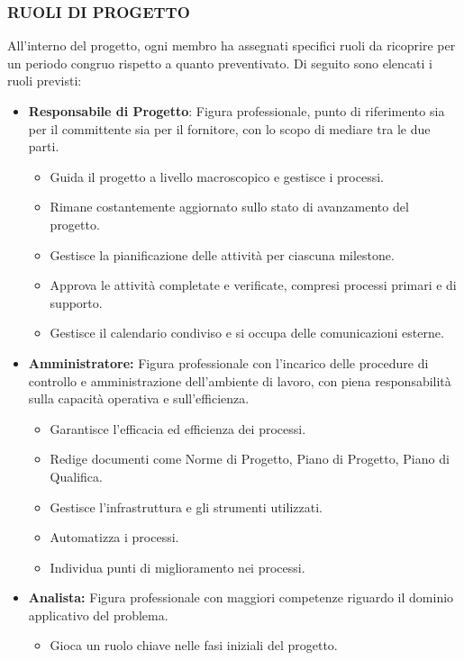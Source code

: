 \documentclass{article}
\begin{document}
\subsubsection{RUOLI DI PROGETTO}
All'interno del progetto, ogni membro ha assegnati specifici ruoli da ricoprire per un periodo congruo rispetto a quanto preventivato. Di seguito sono elencati i ruoli previsti:
\begin{itemize}
    \item \textbf{Responsabile di Progetto}:
        Figura professionale, punto di riferimento sia per il committente sia per il fornitore, con lo scopo di mediare tra le due parti.
        \begin{itemize}
            \item Guida il progetto a livello macroscopico e gestisce i processi.
            \item  Rimane costantemente aggiornato sullo stato di avanzamento del progetto.
            \item Gestisce la pianificazione delle attività per ciascuna milestone.
            \item Approva le attività completate e verificate, compresi processi primari e di supporto.
            \item Gestisce il calendario condiviso e si occupa delle comunicazioni esterne.
        \end{itemize}
    \item \textbf{Amministratore:}
        Figura professionale con l’incarico delle procedure di controllo e amministrazione dell’ambiente di lavoro, con piena responsabilità sulla capacità operativa e sull’efficienza.
        \begin{itemize}
            \item Garantisce l'efficacia ed efficienza dei processi.
            \item Redige documenti come Norme di Progetto, Piano di Progetto, Piano di Qualifica.
            \item Gestisce l'infrastruttura e gli strumenti utilizzati.
            \item Automatizza i processi.
            \item Individua punti di miglioramento nei processi.
        \end{itemize}
    \item \textbf{Analista:}
        Figura professionale con maggiori competenze riguardo il dominio applicativo del problema.
        \begin{itemize}
            \item Gioca un ruolo chiave nelle fasi iniziali del progetto.

\end{itemize}
\end{itemize}
\end{document}
